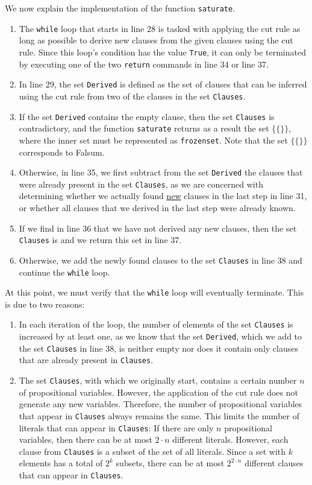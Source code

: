 We now explain the implementation of the function \texttt{saturate}.
\begin{enumerate}
\item The \texttt{while} loop that starts in line 28 is tasked with applying the cut rule
      as long as possible to derive new clauses from the given
      clauses using the cut rule. Since this loop's condition has the value \texttt{True}, it can only be
      terminated by executing one of the two \texttt{return} commands in line 34 or line 37.
\item In line 29, the set \texttt{Derived} is defined as the set of clauses that can be inferred using the
      cut rule from two of the clauses in the set \texttt{Clauses}.
\item If the set \texttt{Derived} contains the empty clause, then the set
      \texttt{Clauses} is contradictory, and the function \texttt{saturate} returns as a result the
      set $\bigl\{ \{\} \bigr\}$, where the inner set must be represented as \texttt{frozenset}. Note that the set $\bigl\{ \{\} \bigr\}$ corresponds to Falsum.
\item Otherwise, in line 35, we first subtract from the set \texttt{Derived} the clauses
      that were already present in the set \texttt{Clauses}, as we are concerned
      with determining whether we actually found 
      \underline{new} clauses in the last step in line 31, or whether all clauses that we derived in the last step were already known.
\item If we find in line 36 that we have not derived any new clauses,
      then the set \texttt{Clauses} is  and we return this set in line 37.
\item Otherwise, we add the newly found clauses to the set
      \texttt{Clauses} in line 38  and continue the \texttt{while} loop.
\end{enumerate}
At this point, we must verify that the \texttt{while} loop will eventually
terminate. This is due to two reasons:
\begin{enumerate}
\item In each iteration of the loop, the number of elements of the set \texttt{Clauses}
      is increased by at least one, as we know that the set \texttt{Derived}, which we add to the
      set \texttt{Clauses} in line 38, is neither empty nor does it contain only
      clauses that are already present in \texttt{Clauses}.
\item The set \texttt{Clauses}, with which we originally start, contains a certain number $n$
      of propositional variables. However, the application of the cut rule does not generate any new
      variables. Therefore, the number of propositional variables that appear in
      \texttt{Clauses} always remains the same. This limits the number of literals
      that can appear in \texttt{Clauses}: If there are only $n$ propositional variables,
      then there can be at most $2 \cdot n$ different literals.  However, each clause from \texttt{Clauses} is
      a subset of the set of all literals.  Since a set with $k$ elements has a total of $2^k$
      subsets, there can be at most $2^{2 \cdot n}$ different clauses that can appear in
      \texttt{Clauses}.
\end{enumerate}
